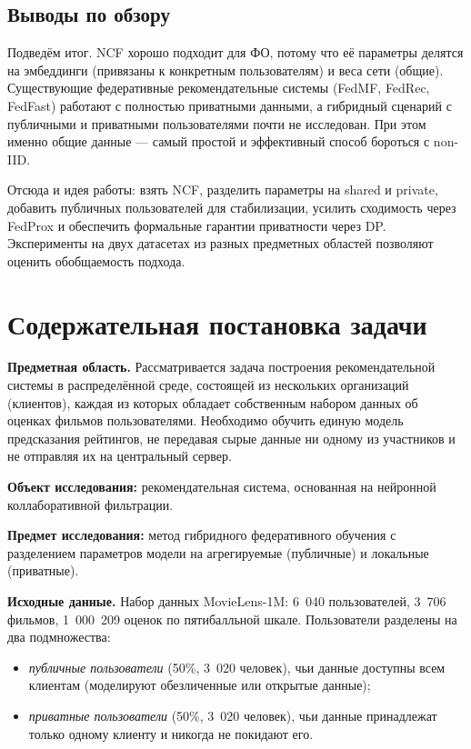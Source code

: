 \documentclass[14pt,a4paper]{extarticle}
\begin{document}
\subsection{Выводы по обзору}

Подведём итог. NCF хорошо подходит для ФО, потому что её параметры делятся на эмбеддинги (привязаны к конкретным пользователям) и веса сети (общие). Существующие федеративные рекомендательные системы (FedMF, FedRec, FedFast) работают с полностью приватными данными, а гибридный сценарий с публичными и приватными пользователями почти не исследован. При этом именно общие данные --- самый простой и эффективный способ бороться с non-IID.

Отсюда и идея работы: взять NCF, разделить параметры на shared и private, добавить публичных пользователей для стабилизации, усилить сходимость через FedProx и обеспечить формальные гарантии приватности через DP. Эксперименты на двух датасетах из разных предметных областей позволяют оценить обобщаемость подхода.

\newpage


\section{Содержательная постановка задачи}

\textbf{Предметная область.}
Рассматривается задача построения рекомендательной системы в распределённой среде, состоящей из нескольких организаций (клиентов), каждая из которых обладает собственным набором данных об оценках фильмов пользователями. Необходимо обучить единую модель предсказания рейтингов, не передавая сырые данные ни одному из участников и не отправляя их на центральный сервер.

\textbf{Объект исследования:} рекомендательная система, основанная на нейронной коллаборативной фильтрации.

\textbf{Предмет исследования:} метод гибридного федеративного обучения с разделением параметров модели на агрегируемые (публичные) и локальные (приватные).

\textbf{Исходные данные.}
Набор данных MovieLens-1M: 6~040 пользователей, 3~706 фильмов, 1~000~209 оценок по пятибалльной шкале. Пользователи разделены на два подмножества:
\begin{itemize}
  \item \textit{публичные пользователи} (50\%, 3~020 человек), чьи данные доступны всем клиентам (моделируют обезличенные или открытые данные);
  \item \textit{приватные пользователи} (50\%, 3~020 человек), чьи данные принадлежат только одному клиенту и никогда не покидают его.
\end{itemize}
\end{document}
